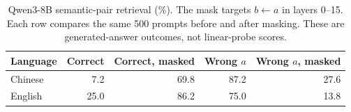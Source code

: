 \begin{table}[!htbp]
\centering\revisioncolor\small
\setlength{\tabcolsep}{5pt}
\caption{Qwen3-8B semantic-pair retrieval (\%). The mask targets $b\leftarrow a$ in layers 0--15. Each row compares the same 500 prompts before and after masking. These are generated-answer outcomes, not linear-probe scores.}
\label{tab:qwen-intervention}
\begin{tabular}{@{}lrrrr@{}}
\toprule
Language & Correct & Correct, masked & Wrong $a$ & Wrong $a$, masked \\
\midrule
Chinese & 7.2 & 69.8 & 87.2 & 27.6 \\
English & 25.0 & 86.2 & 75.0 & 13.8 \\
\bottomrule
\end{tabular}
\end{table}
